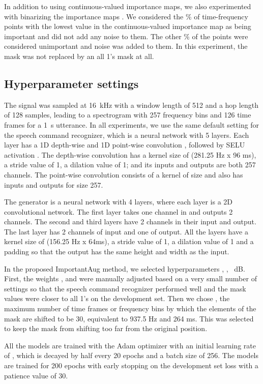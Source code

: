 \documentclass{article}
\begin{document}
In addition to using continuous-valued importance maps, we also experimented with binarizing the importance maps . We considered the \% of time-frequency points with the lowest value in the continuous-valued importance map as being important and did not add any noise to them. The other \% of the points were considered unimportant and noise was added to them. In this experiment, the mask was not replaced by an all 1's mask at all.


\subsection{Hyperparameter settings}

The signal was sampled at 16~kHz with a window length of 512 and a hop length of 128 samples, leading to a spectrogram with 257 frequency bins and 126 time frames for a 1~s utterance. In all experiments, we use the same default setting for the speech command recognizer, which is a neural network with 5 layers. Each layer has a 1D depth-wise and 1D point-wise convolution \cite{chollet2017xception, Somshubra20}, followed by SELU activation \cite{klambauer2017self}. The depth-wise convolution has a kernel size of  (281.25 Hz x 96 ms), a stride value of 1, a dilation value of 1; and its inputs and outputs are both 257 channels. The point-wise convolution consists of a kernel of size  and also has inputs and outputs for size 257. 

The generator is a neural network with 4 layers, where each layer is a 2D convolutional network. The first layer takes one channel in and outputs 2 channels. The second and third layers have 2 channels in their input and output. The last layer has 2 channels of input and one of output. All the layers have a kernel size of  (156.25 Hz x 64ms), a stride value of 1, a dilation value of 1 and a padding so that the output has the same height and width as the input. 

In the proposed ImportantAug method, we selected hyperparameters , , ~dB. First, the weights , and  were manually adjusted based on a very small number of settings so that the speech command recognizer performed well and the mask values were closer to all 1's on the development set. Then we chose , the maximum number of time frames or frequency bins by which the elements of the mask are shifted to be 30, equivalent to 937.5 Hz and 264 ms. This was selected to keep the mask from shifting too far from the original position.

All the models are trained with the Adam optimizer with an initial learning rate of , which is decayed  by half every 20 epochs and a batch size of 256. The models are trained for 200 epochs with early stopping on the development set loss with a patience value of 30.
\end{document}
